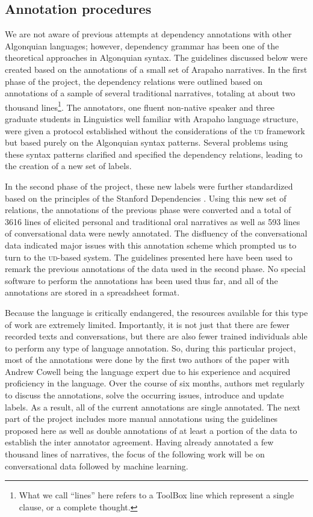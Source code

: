 \documentclass[11pt]{article}
\begin{document}
\subsection{Annotation procedures}
We are not aware of previous attempts at dependency annotations with other Algonquian languages; however, dependency grammar has been one of the theoretical approaches in Algonquian syntax.  The guidelines discussed below were created based on the annotations of a small set of Arapaho narratives. 
In the first phase of the project, the dependency relations were outlined based on annotations of a sample of several traditional narratives, totaling at about two thousand lines\footnote{What we call ``lines'' here refers to a ToolBox line which represent a single clause, or a complete thought.}. The annotators, one fluent non-native speaker and three graduate students in Linguistics well familiar with Arapaho language structure, were given a protocol established without the considerations of the \textsc{ud} framework but based purely on the Algonquian syntax patterns. Several problems using these syntax patterns clarified and specified the dependency relations, leading to the creation of a new set of labels. 

In the second phase of the project, these new labels were further standardized based on the principles of the Stanford Dependencies \cite{Marneffe2008}. Using this new set of relations, the annotations of the previous phase were converted and a total of 3616 lines of elicited personal and traditional oral narratives as well as 593 lines of conversational data were newly annotated.  The disfluency of the conversational data indicated major issues with this annotation scheme which prompted us to turn to the \textsc{ud}-based system. The guidelines presented here have been used to remark the previous annotations of the data used in the second phase. No special software to perform the annotations has been used thus far, and all of the annotations are stored in a spreadsheet format.

Because the language is critically endangered, the resources available for this type of work are extremely limited. Importantly, it is not just that there are fewer recorded texts and conversations, but there are also fewer trained individuals able to perform any type of language annotation. So, during this particular project, most of the annotations were done by the first two authors of the paper with Andrew Cowell being the language expert due to his experience and acquired proficiency in the language. Over the course of six months, authors met regularly to discuss the annotations, solve the occurring  issues, introduce and update labels. As a result, all of the current annotations are single annotated.  The next part of the project includes more manual annotations using the guidelines proposed here as well as double annotations of at least a portion of the data to establish the inter annotator agreement. Having already annotated a few thousand lines of narratives, the focus of the following work will be on conversational data followed by machine learning.
\end{document}
